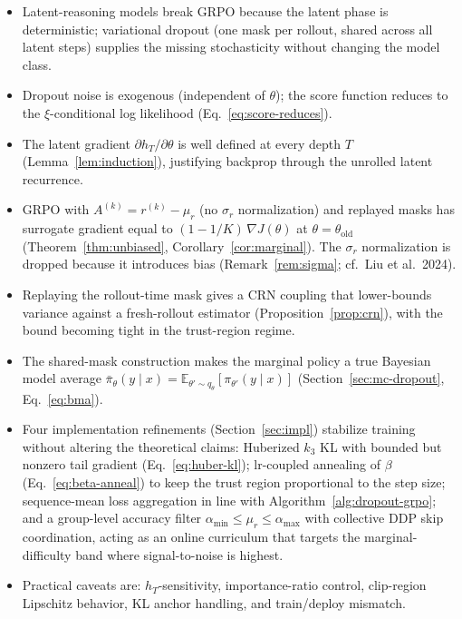 \documentclass[11pt]{article}
\theoremstyle{definition}
\theoremstyle{remark}
\newcommand{\E}{\mathbb{E}}
\newcommand{\old}{\mathrm{old}}
\begin{document}
\begin{itemize}[topsep=2pt,itemsep=2pt]
\item Latent-reasoning models break GRPO because the latent phase is
      deterministic; variational dropout (one mask per rollout, shared
      across all latent steps) supplies the missing stochasticity without
      changing the model class.
\item Dropout noise is exogenous (independent of $\theta$); the score
      function reduces to the $\xi$-conditional log likelihood
      (Eq.~\ref{eq:score-reduces}).
\item The latent gradient $\partial h_T/\partial \theta$ is well defined
      at every depth $T$ (Lemma~\ref{lem:induction}), justifying
      backprop through the unrolled latent recurrence.
\item GRPO with $A^{(k)} = r^{(k)} - \mu_r$ (no $\sigma_r$ normalization)
      and replayed masks has surrogate gradient equal to
      $(1 - 1/K)\,\nabla J(\theta)$ at $\theta = \theta_\old$
      (Theorem~\ref{thm:unbiased}, Corollary~\ref{cor:marginal}).  The
      $\sigma_r$ normalization is dropped because it introduces bias
      (Remark~\ref{rem:sigma}; cf.\ Liu et al.\ 2024).
\item Replaying the rollout-time mask gives a CRN coupling that
      lower-bounds variance against a fresh-rollout estimator
      (Proposition~\ref{prop:crn}), with the bound becoming tight in the
      trust-region regime.
\item The shared-mask construction makes the marginal policy a true
      Bayesian model average $\bar\pi_\theta(y\mid x)
        = \E_{\theta'\sim q_\theta}[\pi_{\theta'}(y\mid x)]$
      (Section~\ref{sec:mc-dropout}, Eq.~\ref{eq:bma}).
\item Four implementation refinements (Section~\ref{sec:impl}) stabilize
      training without altering the theoretical claims:
      Huberized $k_3$ KL with bounded but nonzero tail gradient
      (Eq.~\ref{eq:huber-kl});
      lr-coupled annealing of $\beta$
      (Eq.~\ref{eq:beta-anneal}) to keep the trust region proportional to
      the step size;
      sequence-mean loss aggregation in line with Algorithm~\ref{alg:dropout-grpo};
      and a group-level accuracy filter
      $\alpha_{\min} \le \mu_r \le \alpha_{\max}$ with collective DDP
      skip coordination, acting as an online curriculum that targets the
      marginal-difficulty band where signal-to-noise is highest.
\item Practical caveats are: $h_T$-sensitivity, importance-ratio control,
      clip-region Lipschitz behavior, KL anchor handling, and
      train/deploy mismatch.
\end{itemize}
\end{document}
